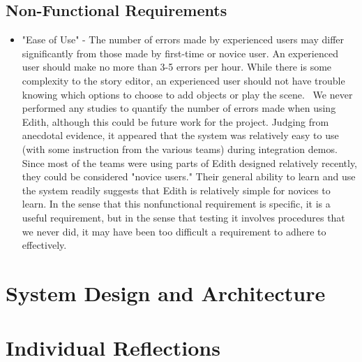 \documentclass[12pt]{article}
\begin{document}
\subsection{Non-Functional Requirements}
\begin{itemize}
\item "Ease of Use" - 	The number of errors made by experienced users may differ significantly from those made by first-time or novice user. An experienced user should make no more than 3-5 errors per hour. While there is some complexity to the story editor, an experienced user should not have trouble knowing which options to choose to add objects or play the scene.
\ We never performed any studies to quantify the number of errors made when using Edith, although this could be future work for the project. Judging from anecdotal evidence, it appeared that the system was relatively easy to use (with some instruction from the various teams) during integration demos. Since most of the teams were using parts of Edith designed relatively recently, they could be considered "novice users." Their general ability to learn and use the system readily suggests that Edith is relatively simple for novices to learn. In the sense that this nonfunctional requirement is specific, it is a useful requirement, but in the sense that testing it involves procedures that we never did, it may have been too difficult a requirement to adhere to effectively.

\end{itemize}
\section{System Design and Architecture}


\section{Individual Reflections}
\end{document}
